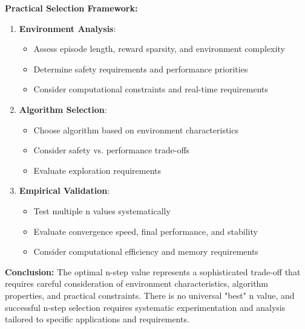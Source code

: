 \documentclass[12pt]{article}
\begin{document}
{{{\textbf{Practical Selection Framework:}

\begin{enumerate}
    \item \textbf{Environment Analysis}:
    \begin{itemize}
        \item Assess episode length, reward sparsity, and environment complexity
        \item Determine safety requirements and performance priorities
        \item Consider computational constraints and real-time requirements
    \end{itemize}
    
    \item \textbf{Algorithm Selection}:
    \begin{itemize}
        \item Choose algorithm based on environment characteristics
        \item Consider safety vs. performance trade-offs
        \item Evaluate exploration requirements
    \end{itemize}
    
    \item \textbf{Empirical Validation}:
    \begin{itemize}
        \item Test multiple n values systematically
        \item Evaluate convergence speed, final performance, and stability
        \item Consider computational efficiency and memory requirements
    \end{itemize}
\end{enumerate}

\textbf{Conclusion:}
The optimal n-step value represents a sophisticated trade-off that requires careful consideration of environment characteristics, algorithm properties, and practical constraints. There is no universal "best" n value, and successful n-step selection requires systematic experimentation and analysis tailored to specific applications and requirements.

}}


\newpage

{}}
\end{document}
